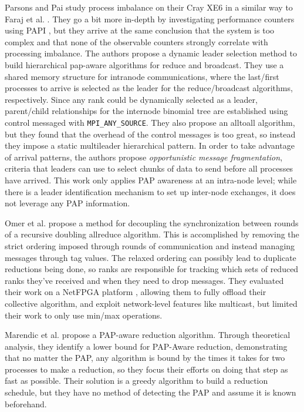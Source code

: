 Parsons and Pai \cite{Parsons2015ExpProcImbMPICollHierarcialSys} study process imbalance on their Cray XE6 in a similar way to Faraj et al. \cite{Faraj2008StudyProcArrivalMPIColl}.
They go a bit more in-depth by investigating performance counters using PAPI \cite{Mucci1999PAPI}, but they arrive at the same conclusion that the system is too complex and that none of the observable counters strongly correlate with processing imbalance. 
The authors propose a dynamic leader selection method to build hierarchical pap-aware algorithms for reduce and broadcast.
They use a shared memory structure for intranode communications, where the last/first processes to arrive is selected as the leader for the reduce/broadcast algorithms, respectively. 
Since any rank could be dynamically selected as a leader, parent/child relationships for the internode binomial tree are established using control messaged with \texttt{MPI\_ANY\_SOURCE}. 
They also propose an alltoall algorithm, but they found that the overhead of the control messages is too great, so instead they impose a static multileader hierarchical pattern.
In order to take advantage of arrival patterns, the authors propose \textit{opportunistic message fragmentation}, criteria that leaders can use to select chunks of data to send before all processes have arrived.
This work only applies PAP awareness at an intra-node level; while there is a leader identification mechanism to set up inter-node exchanges, it does not leverage any PAP information.

Omer et al. \cite{Arap2015AdaptiveRDForCC} propose a method for decoupling the synchronization between rounds of a recursive doubling allreduce algorithm. 
This is accomplished by removing the strict ordering imposed through rounds of communication and instead managing messages through tag values.
The relaxed ordering can possibly lead to duplicate reductions being done, so ranks are responsible for tracking which sets of reduced ranks they've received and when they need to drop messages.
They evaluated their work on a NetFPGA platform \cite{Lockwood2007NetFPGA}, allowing them to fully offload their collective algorithm, and exploit network-level features like multicast, but limited their work to only use min/max operations.

Marendic et al. \cite{Marendic2016Clairvoyant} propose a PAP-aware reduction algorithm.
Through theoretical analysis, they identify a lower bound for PAP-Aware reduction, demonstrating that no matter the PAP, any algorithm is bound by the times it takes for two processes to make a reduction, so they focus their efforts on doing that step as fast as possible. 
Their solution is a greedy algorithm to build a reduction schedule, but they have no method of detecting the PAP and assume it is known beforehand.

